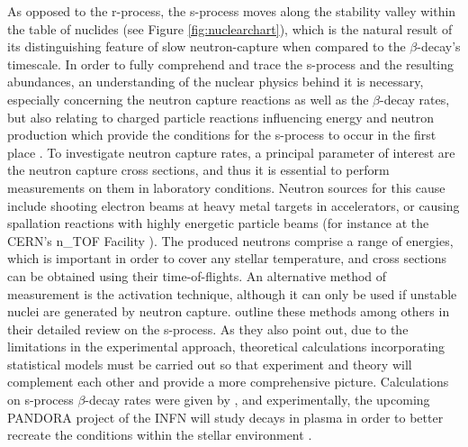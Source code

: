 \documentclass[a4paper,11pt]{article}
\begin{document}
As opposed to the r-process, the s-process moves along the stability valley within the table of nuclides (see Figure \ref{fig:nuclearchart}), which is the natural result of its distinguishing feature of slow neutron-capture when compared to the $\beta$-decay's timescale. In order to fully comprehend and trace the s-process and the resulting abundances, an understanding of the nuclear physics behind it is necessary, especially concerning the neutron capture reactions as well as the $\beta$-decay rates, but also relating to charged particle reactions influencing energy and neutron production which provide the conditions for the s-process to occur in the first place \citep{angulo99,heil08}. To investigate neutron capture rates, a principal parameter of interest are the neutron capture cross sections, and thus it is essential to perform measurements on them in laboratory conditions. Neutron sources for this cause include shooting electron beams at heavy metal targets in accelerators, or causing spallation reactions with highly energetic particle beams (for instance at the CERN's n\_TOF Facility \citep{abbondanno03}). The produced neutrons comprise a range of energies, which is important in order to cover any stellar temperature, and cross sections can be obtained using their time-of-flights. An alternative method of measurement is the activation technique, although it can only be used if unstable nuclei are generated by neutron capture. \citet{kappeler11} outline these methods among others in their detailed review on the s-process. As they also point out, due to the limitations in the experimental approach, theoretical calculations incorporating statistical models must be carried out so that experiment and theory will complement each other and provide a more comprehensive picture. Calculations on s-process $\beta$-decay rates were given by \citet{takahashi87}, and experimentally, the upcoming PANDORA project of the INFN will study decays in plasma in order to better recreate the conditions within the stellar environment \citep{mascali22}.\\ \\
%
\end{document}
